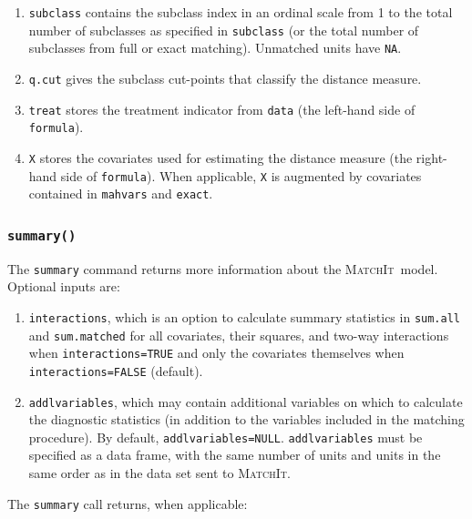 \documentclass[oneside,letterpaper,titlepage]{article}
\newcommand{\MatchIt}{\textsc{MatchIt}}
\begin{document}
\begin{enumerate}
\item \texttt{subclass} contains the subclass index in an ordinal
  scale from 1 to the total number of subclasses as specified in
  \texttt{subclass} (or the total number of subclasses from full or
  exact matching).  Unmatched units have \texttt{NA}.
  
\item \texttt{q.cut} gives the subclass cut-points that classify the
  distance measure.
  
\item \texttt{treat} stores the treatment indicator from \texttt{data}
  (the left-hand side of \texttt{formula}).
 
\item \texttt{X} stores the covariates used for estimating the
  distance measure (the right-hand side of \texttt{formula}).  When
  applicable, \texttt{X} is augmented by covariates contained in
  \texttt{mahvars} and \texttt{exact}. 
\end{enumerate}


\subsubsection{{\tt summary()}}
The \texttt{summary} command returns more information about the
\MatchIt\ model.  Optional inputs are:

\begin{enumerate}
\item \texttt{interactions}, which is an option to calculate summary
  statistics in \texttt{sum.all} and \texttt{sum.matched} for all
  covariates, their squares, and two-way interactions when
  \texttt{interactions=TRUE} and only the covariates themselves when
  \texttt{interactions=FALSE} (default).
\item \texttt{addlvariables}, which may contain additional variables
  on which to calculate the diagnostic statistics (in addition to the
  variables included in the matching procedure).  By default,
  \texttt{addlvariables=NULL}.  \texttt{addlvariables} must be
  specified as a data frame, with the same number of units and units
  in the same order as in the data set sent to \MatchIt .
\end{enumerate}

The \texttt{summary} call returns, when applicable:
\end{document}
